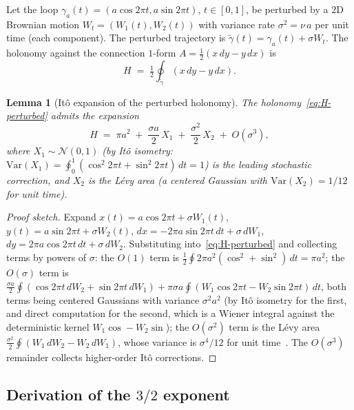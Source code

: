 \documentclass[11pt,a4paper]{article}
\theoremstyle{plain}
\newtheorem{lemma}[theorem]{Lemma}
\theoremstyle{definition}
\theoremstyle{remark}
\begin{document}
Let the loop
$\gamma_{a}(t)=(a\cos 2\pi t,a\sin 2\pi t)$, $t\in[0,1]$, be perturbed
by a $2$D Brownian motion $W_{t}=(W_{1}(t),W_{2}(t))$ with variance
rate $\sigma^{2}=\nu\,a$ per unit time (each component). The perturbed
trajectory is $\tilde\gamma(t)=\gamma_{a}(t)+\sigma W_{t}$. The
holonomy against the connection $1$-form
$A=\tfrac{1}{2}(x\,dy-y\,dx)$ is
\begin{equation}\label{eq:H-perturbed}
  H \;=\; \tfrac{1}{2}\oint_{\tilde\gamma}\!(x\,dy-y\,dx).
\end{equation}

\begin{lemma}[It\^o expansion of the perturbed holonomy]
\label{lem:ito-expand}
The holonomy~\eqref{eq:H-perturbed} admits the expansion
\begin{equation}\label{eq:H-expand}
  H \;=\; \pi a^{2} \;+\; \frac{\sigma a}{2}\,X_{1}
  \;+\; \frac{\sigma^{2}}{2}\,X_{2} \;+\; O(\sigma^{3}),
\end{equation}
where $X_{1}\sim\mathcal N(0,1)$ (by It\^o isometry:
$\mathrm{Var}(X_{1})=\oint_{0}^{1}(\cos^{2}2\pi t+\sin^{2}2\pi t)\,dt=1$)
is the leading stochastic correction, and $X_{2}$ is the L\'evy area
(a centered Gaussian with $\mathrm{Var}(X_{2})=1/12$ for unit time).
\end{lemma}

\begin{proof}[Proof sketch]
Expand $x(t)=a\cos 2\pi t+\sigma W_{1}(t)$,
$y(t)=a\sin 2\pi t+\sigma W_{2}(t)$,
$dx=-2\pi a\sin 2\pi t\,dt+\sigma\,dW_{1}$,
$dy=2\pi a\cos 2\pi t\,dt+\sigma\,dW_{2}$. Substituting
into~\eqref{eq:H-perturbed} and collecting terms by powers of $\sigma$:
the $O(1)$ term is $\tfrac{1}{2}\oint 2\pi a^{2}(\cos^{2}+\sin^{2})\,dt
=\pi a^{2}$; the $O(\sigma)$ term is
$\tfrac{\sigma a}{2}\oint(\cos 2\pi t\,dW_{2}+\sin 2\pi t\,dW_{1})
+\pi\sigma a\oint(W_{1}\cos 2\pi t-W_{2}\sin 2\pi t)\,dt$,
both terms being centered Gaussians with variance $\sigma^{2}a^{2}$
(by It\^o isometry for the first, and direct computation for the
second, which is a Wiener integral against the deterministic kernel
$W_{1}\cos-W_{2}\sin$); the $O(\sigma^{2})$ term is the L\'evy area
$\tfrac{\sigma^{2}}{2}\oint(W_{1}\,dW_{2}-W_{2}\,dW_{1})$, whose
variance is $\sigma^{4}/12$ for unit time~\cite{bhattacharya2007}.
The $O(\sigma^{3})$ remainder collects higher-order It\^o corrections.
\end{proof}

\subsection{Derivation of the $3/2$ exponent}
\end{document}
